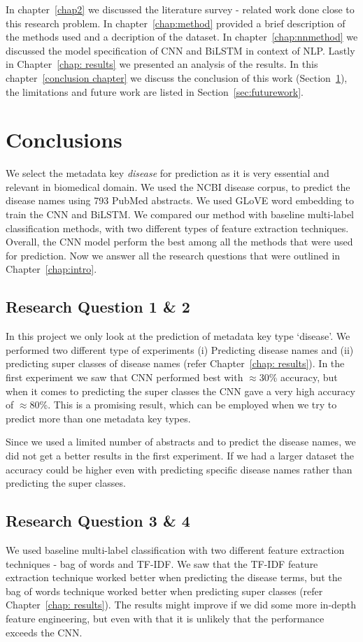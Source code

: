 In chapter~\ref{chap2} we discussed the literature survey - related work done close to this research problem. In chapter~\ref{chap:method} provided a brief description of the methods used and a decription of the dataset. In chapter~\ref{chap:nnmethod} we discussed the model specification of CNN and BiLSTM in context of NLP.  Lastly in Chapter~\ref{chap: results} we presented an analysis of the results. In this chapter~\ref{conclusion chapter} we discuss the conclusion of this work (Section~\ref{sec:conclusion}), the limitations and future work are listed in Section~\ref{sec:futurework}. 

\section{Conclusions}\label{sec:conclusion}
We select the metadata key \emph{disease} for prediction as it is very essential and relevant in biomedical domain. We used the NCBI disease corpus, to predict the disease names using 793 PubMed abstracts. We used GLoVE word embedding to train the CNN and BiLSTM. We compared our method with baseline multi-label classification methods, with two different types of feature extraction techniques. Overall, the CNN model perform the best among all the methods that were used for prediction. Now we answer all the research questions that were outlined in Chapter~\ref{chap:intro}.

\subsection{Research Question 1 \& 2}
In this project we only look at the prediction of metadata key type `disease'. We performed two different type of experiments (i) Predicting disease names and (ii) predicting super classes of disease names (refer Chapter~\ref{chap: results}). In the first experiment we saw that CNN performed best with $\approx$30\% accuracy, but when it comes to predicting the super classes the CNN gave a very high accuracy of $\approx$80\%. This is a promising result, which can be employed when we try to predict more than one metadata key types. 

Since we used a limited number of abstracts and to predict the disease names, we did not get a better results in the first experiment. If we had a larger dataset the accuracy could be higher even with predicting specific disease names rather than predicting the super classes. 

\subsection{Research Question 3 \& 4}
We used baseline multi-label classification with two different feature extraction techniques - bag of words and TF-IDF. We saw that the TF-IDF feature extraction technique worked better when predicting the disease terms, but the bag of words technique worked better when predicting super classes (refer Chapter~\ref{chap: results}). The results might improve if we did some more in-depth feature engineering, but even with that it is unlikely that the performance exceeds the CNN.

